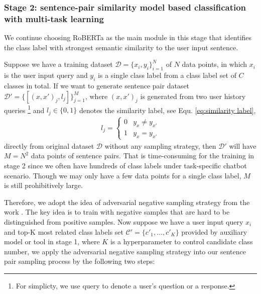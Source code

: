 \documentclass[letterpaper]{article} %
\begin{document}
  \subsubsection*{
    Stage 2: sentence-pair similarity model based classification with multi-task
    learning
  }
  We  continue choosing RoBERTa as the main module in this stage that identifies
  the class label with strongest semantic similarity to the user input sentence.

  Suppose  we have a training dataset $\mathcal{D}=\{x_{i},y_{i}\}_{i=1}^{N}$ of
  $N$  data  points,  in  which $x_{i}$ is the user input query and $y_{i}$ is a
  single  class label from a class label set of $C$ classes in total. If we want
  to             generate            sentence            pair            dataset
  $\mathcal{D'}=\{[(x,x')_{j},l_{j}]\}_{j=1}^{M}$,   where   $(x,   x')_{j}$  is
  generated  from two user history queries \footnote{For simplicty, we use query
  to denote a user's question or a response.} and $l_{j}\in\{0, 1\}$ denotes the
  similarity label, see Equ. \ref{eq:similarity label},
  \begin{align}
    l_{j}=
    \begin{cases} \label{eq:similarity label}
      0 & y_{x}\neq y_{x'}\\
      1 & y_{x}=y_{x'}
    \end{cases}
  \end{align}
  directly  from  original  dataset $\mathcal{D}$ without any sampling strategy,
  then  $\mathcal{D'}$  will have $M=N^2$ data points of sentence pairs. That is
  time-consuming  for  the  training  in stage 2 since we often have hundreds of
  class  labels  under task-specific chatbot scenario. Though we may only have a
  few data points for a single class label, $M$ is still prohibitively large.

  Therefore,  we  adopt  the idea of adversarial negative sampling strategy from
  the  work  \cite{bamler2020extreme}.  The  key  idea is to train with negative
  samples  that  are hard to be distinguished from positive samples. Now suppose
  we  have  a  user  input query $x_{i}$ and top-K most related class labels set
  $\mathcal{C'}=\{c'_{1},  \dots,  c'_{K}\}$ provided by auxiliary model or tool
  in  stage  1, where $K$ is a hyperparameter to control candidate class number,
  we  apply  the  adversarial  negative sampling strategy into our sentence pair
  sampling process by the following two steps:
\end{document}
